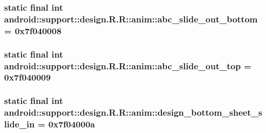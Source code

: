 \hypertarget{classandroid_1_1support_1_1design_1_1_r_1_1anim_c7f548e29aa338924fc9a3cc4434f85c}{
\subsubsection[{abc\_\-slide\_\-out\_\-bottom}]{\setlength{\rightskip}{0pt plus 5cm}static final int android::support::design.R.R::anim::abc\_\-slide\_\-out\_\-bottom = 0x7f040008}}
\label{classandroid_1_1support_1_1design_1_1_r_1_1anim_c7f548e29aa338924fc9a3cc4434f85c}


\hypertarget{classandroid_1_1support_1_1design_1_1_r_1_1anim_c771de9bcb23ca7683c17831812a522f}{
\subsubsection[{abc\_\-slide\_\-out\_\-top}]{\setlength{\rightskip}{0pt plus 5cm}static final int android::support::design.R.R::anim::abc\_\-slide\_\-out\_\-top = 0x7f040009}}
\label{classandroid_1_1support_1_1design_1_1_r_1_1anim_c771de9bcb23ca7683c17831812a522f}


\hypertarget{classandroid_1_1support_1_1design_1_1_r_1_1anim_963d502e777068cc7fd83e4a61e4f4e5}{
\subsubsection[{design\_\-bottom\_\-sheet\_\-slide\_\-in}]{\setlength{\rightskip}{0pt plus 5cm}static final int android::support::design.R.R::anim::design\_\-bottom\_\-sheet\_\-slide\_\-in = 0x7f04000a}}
\label{classandroid_1_1support_1_1design_1_1_r_1_1anim_963d502e777068cc7fd83e4a61e4f4e5}


